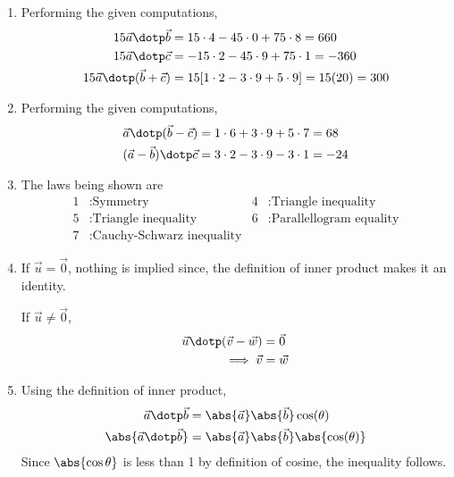 \begin{enumerate}
      \item Performing the given computations,
            \begin{align}
                  15\vec{a} \dotp \vec{b} & = 15 \cdot 4 - 45 \cdot 0 + 75 \cdot 8
                  = 660                                                              \\
                  15\vec{a} \dotp \vec{c} & = -15 \cdot 2 - 45 \cdot 9 + 75 \cdot 1
                  = -360                                                             \\
                  15 \vec{a} \dotp
                  (\vec{b} + \vec{c})     & = 15 [1 \cdot 2 - 3 \cdot 9 + 5 \cdot 9]
                  = 15 (20) = 300
            \end{align}

      \item Performing the given computations,
            \begin{align}
                  \vec{a} \dotp (\vec{b} - \vec{c}) &
                  = 1 \cdot 6 + 3 \cdot 9 + 5 \cdot 7 = 68 \\
                  (\vec{a} - \vec{b}) \dotp \vec{c} &
                  = 3 \cdot 2 - 3 \cdot 9 - 3 \cdot 1 = -24
            \end{align}

      \item The laws being shown are
            \begin{align}
                  1 & : \text{Symmetry}                  &
                  4 & : \text{Triangle inequality}         \\
                  5 & : \text{Triangle inequality}       &
                  6 & : \text{Parallellogram equality}     \\
                  7 & : \text{Cauchy-Schwarz inequality}
            \end{align}

      \item If $ \vec{u} = \vec{0} $, nothing is implied since, the definition of
            inner product makes it an identity. \par
            If $ \vec{u} \neq \vec{0} $,
            \begin{align}
                  \vec{u} \dotp (\vec{v} - \vec{w}) & = \vec{0} \\
                  \implies \vec{v}                  & = \vec{w}
            \end{align}

      \item Using the definition of inner product,
            \begin{align}
                  \vec{a} \dotp \vec{b}       &
                  = \abs{\vec{a}} \abs{\vec{b}} \cos(\theta)       \\
                  \abs{\vec{a} \dotp \vec{b}} &
                  = \abs{\vec{a}} \abs{\vec{b}} \abs{\cos(\theta)} \\
            \end{align}
            Since $ \abs{\cos \theta} $ is less than 1 by definition of cosine, the
            inequality follows.


\end{enumerate}

